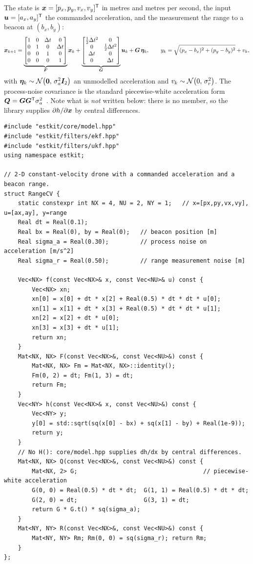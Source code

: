 The state is $\bm{x} = [p_x, p_y, v_x, v_y]^{\mathsf{T}}$ in metres and metres per second, the input
$\bm{u} = [a_x, a_y]^{\mathsf{T}}$ the commanded acceleration, and the measurement the range to a beacon at
$(b_x,b_y)$:
\begin{equation}
\bm{x}_{k+1} = \underbrace{\begin{bmatrix}1&0&\Delta t&0\\0&1&0&\Delta t\\0&0&1&0\\0&0&0&1\end{bmatrix}}_{\bm{F}}\bm{x}_k
 + \underbrace{\begin{bmatrix}\tfrac12\Delta t^2&0\\0&\tfrac12\Delta t^2\\ \Delta t&0\\0&\Delta t\end{bmatrix}}_{\bm{G}}\bm{u}_k
 + \bm{G}\,\bm\eta_k,
\qquad
y_k = \sqrt{(p_x-b_x)^2 + (p_y-b_y)^2} + v_k,
\label{eq:lib-cv}
\end{equation}
with $\bm\eta_k\sim\mathcal{N}\!\left(\bm 0,\,\sigma_a^2\bm{I}_2\right)$ an unmodelled acceleration and
$v_k\sim\mathcal{N}\!\left(0,\,\sigma_r^2\right)$. The process-noise covariance is the standard piecewise-white
acceleration form $\bm{Q} = \bm{G}\bm{G}^{\mathsf{T}}\sigma_a^2$~\cite{barshalom2001}. Note what is \emph{not}
written below: there is no  member, so the library supplies $\partial h/\partial\bm{x}$ by
central differences.

\begin{lstlisting}
#include "estkit/core/model.hpp"
#include "estkit/filters/ekf.hpp"
#include "estkit/filters/ukf.hpp"
using namespace estkit;

// 2-D constant-velocity drone with a commanded acceleration and a beacon range.
struct RangeCV {
    static constexpr int NX = 4, NU = 2, NY = 1;   // x=[px,py,vx,vy], u=[ax,ay], y=range
    Real dt = Real(0.1);
    Real bx = Real(0), by = Real(0);   // beacon position [m]
    Real sigma_a = Real(0.30);         // process noise on acceleration [m/s^2]
    Real sigma_r = Real(0.50);         // range measurement noise [m]

    Vec<NX> f(const Vec<NX>& x, const Vec<NU>& u) const {
        Vec<NX> xn;
        xn[0] = x[0] + dt * x[2] + Real(0.5) * dt * dt * u[0];
        xn[1] = x[1] + dt * x[3] + Real(0.5) * dt * dt * u[1];
        xn[2] = x[2] + dt * u[0];
        xn[3] = x[3] + dt * u[1];
        return xn;
    }
    Mat<NX, NX> F(const Vec<NX>&, const Vec<NU>&) const {
        Mat<NX, NX> Fm = Mat<NX, NX>::identity();
        Fm(0, 2) = dt; Fm(1, 3) = dt;
        return Fm;
    }
    Vec<NY> h(const Vec<NX>& x, const Vec<NU>&) const {
        Vec<NY> y;
        y[0] = std::sqrt(sq(x[0] - bx) + sq(x[1] - by) + Real(1e-9));
        return y;
    }
    // No H(): core/model.hpp supplies dh/dx by central differences.
    Mat<NX, NX> Q(const Vec<NX>&, const Vec<NU>&) const {
        Mat<NX, 2> G;                                    // piecewise-white acceleration
        G(0, 0) = Real(0.5) * dt * dt;  G(1, 1) = Real(0.5) * dt * dt;
        G(2, 0) = dt;                   G(3, 1) = dt;
        return G * G.t() * sq(sigma_a);
    }
    Mat<NY, NY> R(const Vec<NX>&, const Vec<NU>&) const {
        Mat<NY, NY> Rm; Rm(0, 0) = sq(sigma_r); return Rm;
    }
};
\end{lstlisting}

